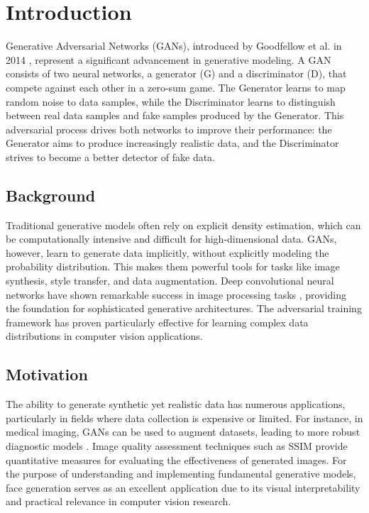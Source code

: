 \documentclass[a4paper, journal]{IEEEtran}
\begin{document}
\section{Introduction}

Generative Adversarial Networks (GANs), introduced by Goodfellow et al. in 2014 \cite{goodfellow2014generative}, represent a significant advancement in generative modeling. A GAN consists of two neural networks, a generator (G) and a discriminator (D), that compete against each other in a zero-sum game. The Generator learns to map random noise to data samples, while the Discriminator learns to distinguish between real data samples and fake samples produced by the Generator. This adversarial process drives both networks to improve their performance: the Generator aims to produce increasingly realistic data, and the Discriminator strives to become a better detector of fake data.

\subsection{Background}
Traditional generative models often rely on explicit density estimation, which can be computationally intensive and difficult for high-dimensional data. GANs, however, learn to generate data implicitly, without explicitly modeling the probability distribution. This makes them powerful tools for tasks like image synthesis, style transfer, and data augmentation. Deep convolutional neural networks have shown remarkable success in image processing tasks \cite{krizhevsky2012imagenet}, providing the foundation for sophisticated generative architectures. The adversarial training framework has proven particularly effective for learning complex data distributions in computer vision applications.

\subsection{Motivation}
The ability to generate synthetic yet realistic data has numerous applications, particularly in fields where data collection is expensive or limited. For instance, in medical imaging, GANs can be used to augment datasets, leading to more robust diagnostic models \cite{ronneberger2015u}. Image quality assessment techniques such as SSIM \cite{wang2004ssim} provide quantitative measures for evaluating the effectiveness of generated images. For the purpose of understanding and implementing fundamental generative models, face generation serves as an excellent application due to its visual interpretability and practical relevance in computer vision research.
\end{document}
